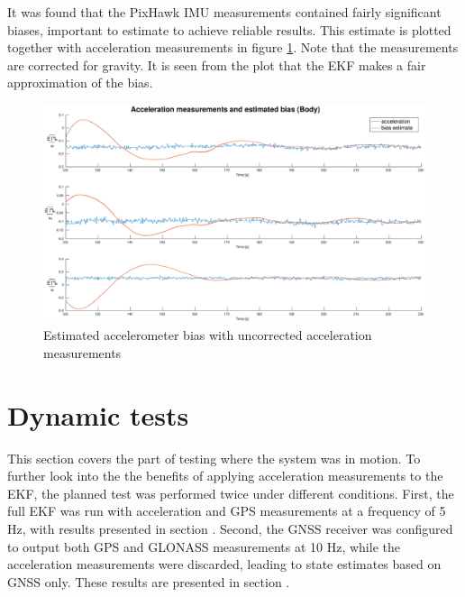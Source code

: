     It was found that the PixHawk IMU measurements contained fairly significant biases, important to estimate to achieve reliable results. This estimate is plotted together with acceleration measurements in figure \ref{fig:bias-acc}. Note that the measurements are corrected for gravity. It is seen from the plot that the EKF makes a fair approximation of the bias.\\
    
    \begin{figure}[!htbp]
        \hspace{-1.5cm}
        \includegraphics[scale=0.3]{Results/Images/bias-acc.eps}
        \caption{Estimated accelerometer bias with uncorrected acceleration measurements}
        \label{fig:bias-acc}
    \end{figure}
    
\section{Dynamic tests}
    This section covers the part of testing where the system was in motion. To further look into the the benefits of applying acceleration measurements to the EKF, the planned test was performed twice under different conditions. First, the full EKF was run with acceleration and GPS measurements at a frequency of 5 Hz, with results presented in section \label{sec:res:tightly-coupled}. Second, the GNSS receiver was configured to output both GPS and GLONASS measurements at 10 Hz, while the acceleration measurements were discarded, leading to state estimates based on GNSS only. These results are presented in section \label{sec:res:multi-gnss}.\\
    
    


